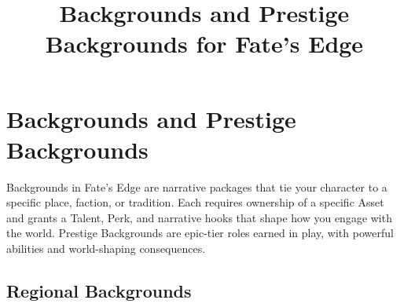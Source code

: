\documentclass[12pt]{article}
\title{Backgrounds and Prestige Backgrounds for Fate's Edge}
\author{}
\date{}
\begin{document}
\maketitle

\section*{Backgrounds and Prestige Backgrounds}

Backgrounds in Fate's Edge are narrative packages that tie your character to a specific place, faction, or tradition. Each requires ownership of a specific Asset and grants a Talent, Perk, and narrative hooks that shape how you engage with the world. Prestige Backgrounds are epic-tier roles earned in play, with powerful abilities and world-shaping consequences.

\subsection*{Regional Backgrounds}
\end{document}
